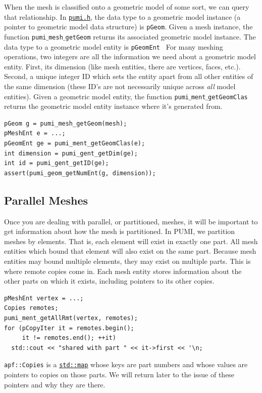 \documentclass{article}
\begin{document}
{When the mesh is classified onto a geometric model of some sort, we
can query that relationship. In \href{https://github.com/SCOREC/core/blob/master/pumi/pumi.h}{\texttt{pumi.h}}, the data type to a geometric model instance (a pointer to geometric model data structure) is \texttt{pGeom}. Given a mesh instance, the function \texttt{pumi$\_$mesh$\_$getGeom} returns its associated geometric model instance. The data type to a geometric model entity is {\texttt{pGeomEnt}}
\
For many meshing operations, two integers are all the information
we need about a geometric model entity.
First, its dimension (like mesh entities, there are vertices, faces, etc.).
Second, a unique integer ID which sets the entity apart from
all other entities of the same dimension (these ID's are not necessarily
unique across \emph{all} model entities).
Given a geometric model entity, the function \texttt{pumi$\_$ment$\_$getGeomClas} returns the geometric model entity instance where it's generated from.

\begin{lstlisting}
pGeom g = pumi_mesh_getGeom(mesh);
pMeshEnt e = ...;
pGeomEnt ge = pumi_ment_getGeomClas(e);
int dimension = pumi_gent_getDim(ge);
int id = pumi_gent_getID(ge);
assert(pumi_geom_getNumEnt(g, dimension));
\end{lstlisting}

\subsection{Parallel Meshes}

Once you are dealing with parallel, or partitioned, meshes,
it will be important to get information about how the
mesh is partitioned.
In PUMI, we partition meshes by elements.
That is, each element will exist in exactly one part.
All mesh entities which bound that element will also exist on
the same part.
Because mesh entities may bound multiple elements, they may
exist on multiple parts.
This is where remote copies come in.
Each mesh entity stores information about the other parts
on which it exists, including pointers to its other copies.

\begin{lstlisting}
pMeshEnt vertex = ...;
Copies remotes;
pumi_ment_getAllRmt(vertex, remotes);
for (pCopyIter it = remotes.begin();
     it != remotes.end(); ++it)
  std::cout << "shared with part " << it->first << '\n;
\end{lstlisting}

\texttt{apf::Copies}
is a
\href{http://www.cplusplus.com/reference/map/map/}{\texttt{std::map}}
whose keys are part numbers and whose
values are pointers to copies on those parts.
We will return later to the issue of these pointers and
why they are there.

}
\end{document}
